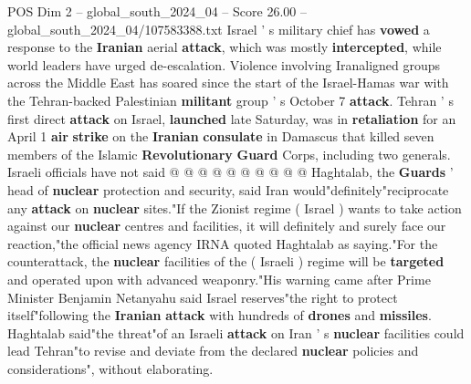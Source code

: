 \begin{textsample}{POS Dim 2 – global\_south\_2024\_04 – Score 26.00 – global\_south\_2024\_04/107583388.txt}
Israel ' s military chief has \textbf{vowed} a response to the \textbf{Iranian} aerial \textbf{attack}, which was mostly \textbf{intercepted}, while world leaders have urged de-escalation.
Violence involving Iranaligned groups across the Middle East has soared since the start of the Israel-Hamas war with the Tehran-backed Palestinian \textbf{militant} group ' s October 7 \textbf{attack}.
Tehran ' s first direct \textbf{attack} on Israel, \textbf{launched} late Saturday, was in \textbf{retaliation} for an April 1 \textbf{air} \textbf{strike} on the \textbf{Iranian} \textbf{consulate} in Damascus that killed seven members of the Islamic \textbf{Revolutionary} \textbf{Guard} Corps, including two generals.
Israeli officials have not said @ @ @ @ @ @ @ @ @ @ Haghtalab, the \textbf{Guards} ' head of \textbf{nuclear} protection and security, said Iran would"definitely"reciprocate any \textbf{attack} on \textbf{nuclear} sites."If the Zionist regime ( Israel ) wants to take action against our \textbf{nuclear} centres and facilities, it will definitely and surely face our reaction,"the official news agency IRNA quoted Haghtalab as saying."For the counterattack, the \textbf{nuclear} facilities of the ( Israeli ) regime will be \textbf{targeted} and operated upon with advanced weaponry."His warning came after Prime Minister Benjamin Netanyahu said Israel reserves"the right to protect itself"following the \textbf{Iranian} \textbf{attack} with hundreds of \textbf{drones} and \textbf{missiles}.
Haghtalab said"the threat"of an Israeli \textbf{attack} on Iran ' s \textbf{nuclear} facilities could lead Tehran"to revise and deviate from the declared \textbf{nuclear} policies and considerations", without elaborating.

\end{textsample}
